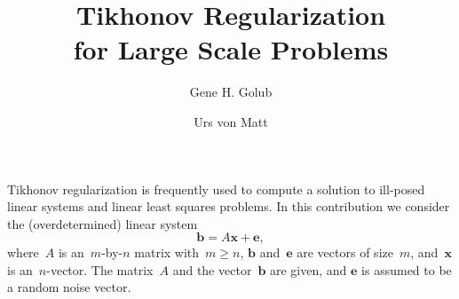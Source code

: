 \documentclass[a4paper,10pt]{amsart}
\renewcommand{\vec}[1]{\mathbf{\boldsymbol{#1}}}
\begin{document}
\title{Tikhonov Regularization \\ for Large Scale Problems}

\author{Gene H. Golub}
\address{Department of Computer Science \\
         Stanford University \\
         Stanford, CA~94305-2140}

\author{Urs von Matt}
\address{Swiss Center for Scientific Computing \\
         ETH Zentrum \\
         CH-8092 Z\"urich \\
         Switzerland}

\maketitle


Tikhonov regularization is frequently used to compute a
solution to ill-posed linear systems and linear least squares problems.
In this contribution we consider the (overdetermined) linear system
\begin{equation*}
  \vec{b} = A \vec{x} + \vec{e},
\end{equation*}
where~$A$ is an~$m$-by-$n$ matrix with~${m \geq n}$,
$\vec{b}$ and~$\vec{e}$ are vectors of size~$m$,
and~$\vec{x}$ is an~$n$-vector.
The matrix~$A$ and the vector~$\vec{b}$ are given,
and $\vec{e}$ is assumed to be a random noise vector.
\end{document}
